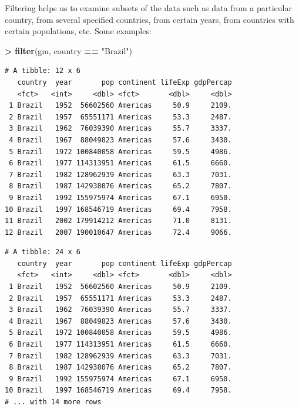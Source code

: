 \documentclass[]{krantz}
\makeatletter
\newenvironment{Shaded}{\begin{snugshade}}{\end{snugshade}}
\newcommand{\KeywordTok}[1]{\textcolor[rgb]{0.27,0.27,0.27}{\textbf{#1}}}
\newcommand{\StringTok}[1]{\textcolor[rgb]{0.5,0.5,0.5}{#1}}
\newcommand{\OperatorTok}[1]{\textcolor[rgb]{0.43,0.43,0.43}{\textbf{#1}}}
\newcommand{\NormalTok}[1]{#1}
\newenvironment{kframe}{%
\medskip{}
\setlength{\fboxsep}{.8em}
 \def\at@end@of@kframe{}%
 \ifinner\ifhmode%
  \def\at@end@of@kframe{\end{minipage}}%
  \begin{minipage}{\columnwidth}%
 \fi\fi%
 \def\FrameCommand##1{\hskip\@totalleftmargin \hskip-\fboxsep
 \colorbox{shadecolor}{##1}\hskip-\fboxsep
     \hskip-\linewidth \hskip-\@totalleftmargin \hskip\columnwidth}%
 \MakeFramed {\advance\hsize-\width
   \@totalleftmargin\z@ \linewidth\hsize
   \@setminipage}}%
 {\par\unskip\endMakeFramed%
 \at@end@of@kframe}
\renewenvironment{Shaded}{\begin{kframe}}{\end{kframe}}
\makeatother
\begin{document}
Filtering helps us to examine subsets of the data such as data from a
particular country, from several specified countries, from certain
years, from countries with certain populations, etc. Some examples:

\begin{Shaded}
\begin{Highlighting}[]
\OperatorTok{>}\StringTok{ }\KeywordTok{filter}\NormalTok{(gm, country }\OperatorTok{==}\StringTok{ "Brazil"}\NormalTok{)}
\end{Highlighting}
\end{Shaded}

\begin{verbatim}
# A tibble: 12 x 6
   country  year       pop continent lifeExp gdpPercap
   <fct>   <int>     <dbl> <fct>       <dbl>     <dbl>
 1 Brazil   1952  56602560 Americas     50.9     2109.
 2 Brazil   1957  65551171 Americas     53.3     2487.
 3 Brazil   1962  76039390 Americas     55.7     3337.
 4 Brazil   1967  88049823 Americas     57.6     3430.
 5 Brazil   1972 100840058 Americas     59.5     4986.
 6 Brazil   1977 114313951 Americas     61.5     6660.
 7 Brazil   1982 128962939 Americas     63.3     7031.
 8 Brazil   1987 142938076 Americas     65.2     7807.
 9 Brazil   1992 155975974 Americas     67.1     6950.
10 Brazil   1997 168546719 Americas     69.4     7958.
11 Brazil   2002 179914212 Americas     71.0     8131.
12 Brazil   2007 190010647 Americas     72.4     9066.
\end{verbatim}

\begin{Shaded}
\end{Shaded}

\begin{verbatim}
# A tibble: 24 x 6
   country  year       pop continent lifeExp gdpPercap
   <fct>   <int>     <dbl> <fct>       <dbl>     <dbl>
 1 Brazil   1952  56602560 Americas     50.9     2109.
 2 Brazil   1957  65551171 Americas     53.3     2487.
 3 Brazil   1962  76039390 Americas     55.7     3337.
 4 Brazil   1967  88049823 Americas     57.6     3430.
 5 Brazil   1972 100840058 Americas     59.5     4986.
 6 Brazil   1977 114313951 Americas     61.5     6660.
 7 Brazil   1982 128962939 Americas     63.3     7031.
 8 Brazil   1987 142938076 Americas     65.2     7807.
 9 Brazil   1992 155975974 Americas     67.1     6950.
10 Brazil   1997 168546719 Americas     69.4     7958.
# ... with 14 more rows
\end{verbatim}
\end{document}
